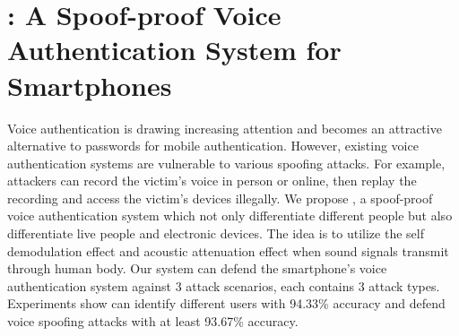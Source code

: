 \chapter{{\mv}: A Spoof-proof Voice Authentication System for Smartphones}

	Voice authentication is drawing increasing attention and becomes an attractive alternative to passwords for mobile authentication. However, existing voice authentication systems are vulnerable to various spoofing attacks. For example, attackers can record the victim's voice in person or online, then replay the recording and access the victim's devices illegally. 
We propose \shortname, a spoof-proof voice authentication system which not only differentiate different people but also differentiate live people and electronic devices. The idea is to utilize the self demodulation effect and acoustic attenuation effect when sound signals transmit through human body. Our system can defend the smartphone's voice authentication system against 3 attack scenarios, each contains 3 attack types. Experiments show  {\shortname} can identify different users with 94.33\% accuracy and defend voice spoofing attacks with at least 93.67\% accuracy. 
















